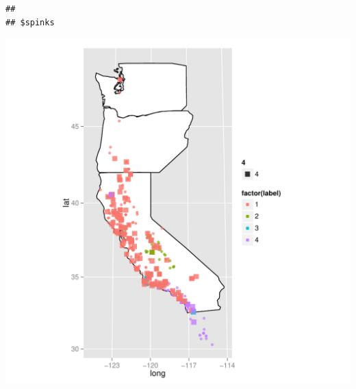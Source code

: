 \documentclass{article}\usepackage{graphicx, color}
\makeatletter
\def\maxwidth{ %
  \ifdim\Gin@nat@width>\linewidth
    \linewidth
  \else
    \Gin@nat@width
  \fi
}
\newenvironment{kframe}{%
 \def\at@end@of@kframe{}%
 \ifinner\ifhmode%
  \def\at@end@of@kframe{\end{minipage}}%
  \begin{minipage}{\columnwidth}%
 \fi\fi%
 \def\FrameCommand##1{\hskip\@totalleftmargin \hskip-\fboxsep
 \colorbox{shadecolor}{##1}\hskip-\fboxsep
     \hskip-\linewidth \hskip-\@totalleftmargin \hskip\columnwidth}%
 \MakeFramed {\advance\hsize-\width
   \@totalleftmargin\z@ \linewidth\hsize
   \@setminipage}}%
 {\par\unskip\endMakeFramed%
 \at@end@of@kframe}
\newenvironment{knitrout}{}{} %
\makeatother
\begin{document}
\begin{knitrout}
\begin{kframe}\begin{verbatim}
## 
## $spinks
\end{verbatim}
\end{kframe}
\includegraphics[width=\maxwidth]{figure/rf-map4} 


\end{knitrout}
\end{document}
